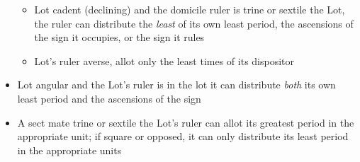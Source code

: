 \begin{mdframed}[backgroundcolor=cyan!05]
\begin{itemize}[itemsep=1pt, topsep=1pt, partopsep=0pt]
\begin{itemize}[itemsep=1pt, topsep=1pt, partopsep=0pt]
\item Lot cadent (declining) and the domicile ruler is trine or sextile the Lot, the ruler can distribute the \textsl{least} of its own least period, the ascensions of the sign it occupies, or the sign it rules
\item Lot's ruler averse, allot only the least times of its dispositor
\end{itemize}
\item Lot angular and the Lot's ruler is in the lot it can distribute \textsl{both} its own least period and the ascensions of the sign
\item A sect mate trine or sextile the Lot's ruler can allot its greatest period in the appropriate unit; if square or opposed, it can only distribute its least period in the appropriate units
\end{itemize}

\end{mdframed}

\newpage